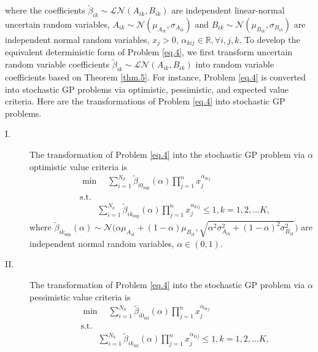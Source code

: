 where the coefficients ${\tilde{\beta}_{ik}}\sim \mathcal{LN}(A_{ik},B_{ik})$ are independent linear-normal uncertain random variables, $A_{ik}\sim\mathcal{N}(\mu_{A_{ik}},\sigma_{A_{ik}})$ and $B_{ik}\sim\mathcal{N}(\mu_{B_{ik}},\sigma_{B_{ik}})$ are independent normal random variables, $x_j>0$, $\alpha_{kij} \in \mathbb{R},\forall i,j,k$. To develop the equivalent deterministic form of Problem \ref{eq.4}, we first transform uncertain random variable coefficients ${\tilde{\beta}_{ik}}\sim \mathcal{LN}(A_{ik},B_{ik})$ into random variable coefficients based on Theorem \ref{thm.5}. For instance, Problem \ref{eq.4} is converted into stochastic GP problems via optimistic, pessimistic, and expected value criteria. Here are the transformations of Problem \ref{eq.4} into stochastic GP problems.
\begin{description}
	\item[I.] The transformation of Problem \ref{eq.4} into the stochastic GP problem via $\alpha$ optimistic value criteria is 
	\begin{equation}\label{eq.5}
		\begin{aligned}
			&	\min \quad \sum\limits_{i=1}^{N_0}{\tilde{\beta}}_{{i0}_{\sup}}(\alpha)\prod\limits_{j=1}^{n}x_j^{\alpha_{0ij}}\\
			&	\text{s.t.}\\
			& \qquad \sum\limits_{i=1}^{N_k}{\tilde{\beta}}_{{ik}_{\sup}}(\alpha)\prod\limits_{j=1}^{n}x_j^{\alpha_{kij}}\leq 1,k=1,2,\ldots K,
		\end{aligned}
	\end{equation}
where ${\tilde{\beta}}_{{ik}_{\sup}}(\alpha)\sim \mathcal{N}\big(\alpha\mu_{A_{ik}}+(1-\alpha)\mu_{B_{ik}},\sqrt{\alpha^2\sigma_{A_{ik}}^2+(1-\alpha)^2\sigma_{B_{ik}}^2}\big)$ are independent normal random variables, $\alpha\in (0,1)$.
\item[II.] The transformation of Problem \ref{eq.4} into the stochastic GP problem via $\alpha$ pessimistic value criteria is 
\begin{equation}\label{eq.6}
	\begin{aligned}
		&	\min \quad \sum\limits_{i=1}^{N_0}{\tilde{\beta}}_{{i0}_{\inf}}(\alpha)\prod\limits_{j=1}^{n}x_j^{\alpha_{0ij}}\\
		&	\text{s.t.}\\
		& \qquad \sum\limits_{i=1}^{N_k}{\tilde{\beta}}_{{ik}_{\inf}}(\alpha)\prod\limits_{j=1}^{n}x_j^{\alpha_{kij}}\leq 1,k=1,2,\ldots K,
	\end{aligned}
\end{equation}

\end{description}
